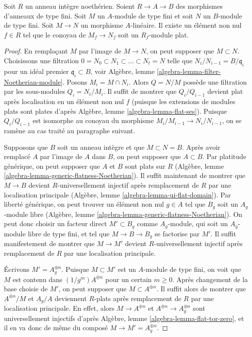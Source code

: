 \begin{lemma}
\label{lemma-cokernel-flat}
Soit $R$ un anneau intègre noethérien. Soient $R \to A \to B$ des morphismes d'anneaux de type fini.
Soit $M$ un $A$-module de type fini et soit $N$ un $B$-module de type fini.
Soit $M \to N$ un morphisme $A$-linéaire. Il existe un élément non nul $f \in R$
tel que le conoyau de $M_f \to N_f$ soit un $R_f$-module plat.
\end{lemma}

\begin{proof}
En remplaçant $M$ par l'image de $M \to N$, on peut supposer que $M \subset N$.
Choisissons une filtration $0 = N_0 \subset N_1 \subset \ldots \subset N_t = N$
telle que $N_i/N_{i - 1} = B/\mathfrak q_i$ pour un idéal premier
$\mathfrak q_i \subset B$, voir
Algèbre, lemme \ref{algebra-lemma-filter-Noetherian-module}.
Posons $M_i = M \cap N_i$. Alors $Q = N/M$ possède une filtration par les sous-modules
$Q_i = N_i/M_i$. Il suffit de montrer que $Q_i/Q_{i - 1}$ devient plat
après localisation en un élément non nul $f$ (puisque les extensions de
modules plats sont plates d'après Algèbre, lemme \ref{algebra-lemma-flat-ses}).
Puisque $Q_i/Q_{i - 1}$ est isomorphe au conoyau
du morphisme $M_i/M_{i - 1} \to N_i/N_{i - 1}$, on se ramène au
cas traité au paragraphe suivant.

\medskip\noindent
Supposons que $B$ soit un anneau intègre et que $M \subset N = B$. Après avoir remplacé $A$ par
l'image de $A$ dans $B$, on peut supposer que $A \subset B$. Par platitude générique,
on peut supposer que $A$ et $B$ sont plats sur $R$
(Algèbre, lemme \ref{algebra-lemma-generic-flatness-Noetherian}).
Il suffit maintenant de montrer que $M \to B$ devient $R$-universellement
injectif après remplacement de $R$ par une localisation
principale (Algèbre, lemme \ref{algebra-lemma-ui-flat-domain}).
Par liberté générique, on peut trouver un élément non nul $g \in A$ tel que
$B_g$ soit un $A_g$-module libre
(Algèbre, lemme \ref{algebra-lemma-generic-flatness-Noetherian}).
On peut donc choisir un facteur direct $M' \subset B_g$ comme $A_g$-module,
qui soit un $A_g$-module libre de type fini, et
tel que $M \to B \to B_g$ se factorise par $M'$.
Il suffit manifestement de montrer que $M \to M'$
devient $R$-universellement injectif après remplacement de
$R$ par une localisation principale.

\medskip\noindent
Écrivons $M' = A_g^{\oplus n}$. Puisque $M \subset M'$ est un $A$-module de type fini,
on voit que $M$ est contenu dans $(1/g^m)A^{\oplus n}$ pour un certain $m \geq 0$.
Après changement de la base choisie de $M'$, on peut supposer que $M \subset A^{\oplus n}$.
Il suffit alors de montrer que $A^{\oplus n}/M$ et $A_g/A$ deviennent
$R$-plats après remplacement de $R$ par une localisation principale. En effet, alors
$M \to A^{\oplus n}$ et $A^{\oplus n} \to A_g^{\oplus n}$ sont
universellement injectifs d'après Algèbre, lemme \ref{algebra-lemma-flat-tor-zero},
et il en va donc de même du composé $M \to M' = A_g^{\oplus n}$.


\end{proof}
